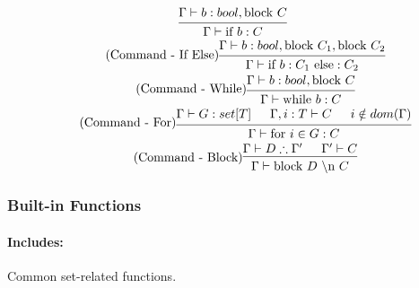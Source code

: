 \documentclass{article}
\begin{document}
\begin{gather}
\begin{prooftree}
\hypo{\Gamma \vdash b: bool, \text{block }C}
\infer1{\Gamma \vdash \text{if } b: C}
\end{prooftree}
\\
\tag{Command - If Else}
\begin{prooftree}
\hypo{\Gamma \vdash b: bool, \text{block }C_1, \text{block }C_2}
\infer1{\Gamma \vdash \text{if } b: C_1 \text{ else}: C_2}
\end{prooftree}
\\
\tag{Command - While}
\begin{prooftree}
\hypo{\Gamma \vdash b: bool, \text{block }C}
\infer1{\Gamma \vdash \text{while } b: C}
\end{prooftree}
\\
\tag{Command - For}
\begin{prooftree}
\hypo{\Gamma \vdash G: set[T]}
\hypo{\Gamma, i: T \vdash C}
\hypo{i \notin dom(\Gamma)}
\infer3{\Gamma \vdash \text{for } i \in G: C}
\end{prooftree}
\\
\tag{Command - Block}
\begin{prooftree}
\hypo{\Gamma \vdash D \therefore \Gamma'}
\hypo{\Gamma' \vdash C}
\infer2{\Gamma \vdash \text{block }D \text{ \textbackslash n } C}
\end{prooftree}
\end{gather}



\subsubsection{Built-in Functions}
\paragraph{Includes:} Common set-related functions.
\end{document}
